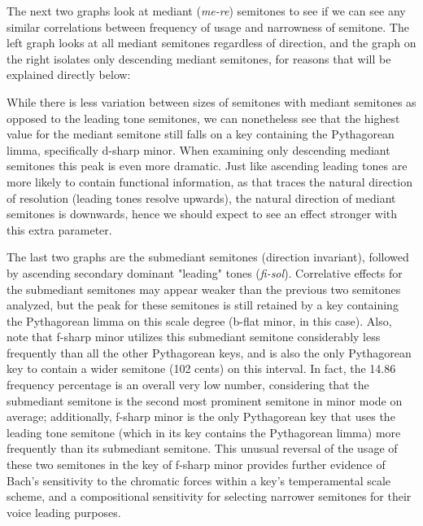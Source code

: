     \begin{center}
    \end{center}
    
    The next two graphs look at mediant (\emph{me-re}) semitones to see if
we can see any similar correlations between frequency of usage and
narrowness of semitone. The left graph looks at all mediant semitones
regardless of direction, and the graph on the right isolates only
descending mediant semitones, for reasons that will be explained
directly below:


    \begin{center}
    \end{center}
    
    While there is less variation between sizes of semitones with mediant
semitones as opposed to the leading tone semitones, we can nonetheless
see that the highest value for the mediant semitone still falls on a key
containing the Pythagorean limma, specifically d-sharp minor. When
examining only descending mediant semitones this peak is even more
dramatic. Just like ascending leading tones are more likely to contain
functional information, as that traces the natural direction of
resolution (leading tones resolve upwards), the natural direction of
mediant semitones is downwards, hence we should expect to see an effect
stronger with this extra parameter.

The last two graphs are the submediant semitones (direction invariant),
followed by ascending secondary dominant "leading" tones
(\emph{fi-sol}). Correlative effects for the submediant semitones may
appear weaker than the previous two semitones analyzed, but the peak for
these semitones is still retained by a key containing the Pythagorean
limma on this scale degree (b-flat minor, in this case). Also, note that
f-sharp minor utilizes this submediant semitone considerably less
frequently than all the other Pythagorean keys, and is also the only
Pythagorean key to contain a wider semitone (102 cents) on this
interval. In fact, the 14.86 frequency percentage is an overall very low
number, considering that the submediant semitone is the second most
prominent semitone in minor mode on average; additionally, f-sharp minor
is the only Pythagorean key that uses the leading tone semitone (which
in its key contains the Pythagorean limma) more frequently than its
submediant semitone. This unusual reversal of the usage of these two
semitones in the key of f-sharp minor provides further evidence of
Bach's sensitivity to the chromatic forces within a key's temperamental
scale scheme, and a compositional sensitivity for selecting narrower
semitones for their voice leading purposes.

